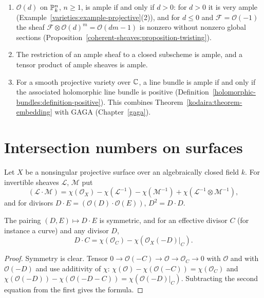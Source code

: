 \begin{example}\label{divisors:example-ample}
\begin{enumerate}
\item $\mathcal{O}(d)$ on $\mathbb{P}^n_k$, $n \geq 1$, is ample if and only if $d > 0$: for $d > 0$ it is very ample (Example~\ref{varieties:example-projective}(2)), and for
$d \leq 0$ and $\mathcal{F} = \mathcal{O}(-1)$ the sheaf $\mathcal{F} \otimes \mathcal{O}(d)^m = \mathcal{O}(dm - 1)$ is nonzero without nonzero global sections
(Proposition~\ref{coherent-sheaves:proposition-twisting}).
\item The restriction of an ample sheaf to a closed subscheme is ample, and a tensor product of ample sheaves is ample.
\item For a smooth projective variety over $\mathbb{C}$, a line bundle is ample if and only if the associated holomorphic line bundle is positive
(Definition~\ref{holomorphic-bundles:definition-positive}). This combines Theorem~\ref{kodaira:theorem-embedding} with GAGA (Chapter~\ref{gaga}).
\end{enumerate}
\end{example}

\section{Intersection numbers on surfaces}\label{divisors:section-intersection-surfaces}

\begin{definition}\label{divisors:definition-intersection-number}
Let $X$ be a nonsingular projective surface over an algebraically closed field $k$. For invertible sheaves $\mathcal{L}$, $\mathcal{M}$ put
\[
(\mathcal{L} \cdot \mathcal{M}) = \chi(\mathcal{O}_X) - \chi(\mathcal{L}^{-1}) - \chi(\mathcal{M}^{-1}) + \chi(\mathcal{L}^{-1} \otimes \mathcal{M}^{-1}),
\]
and for divisors $D \cdot E = (\mathcal{O}(D) \cdot \mathcal{O}(E))$, $D^2 = D \cdot D$.
\end{definition}

\begin{proposition}\label{divisors:proposition-intersection-curve}
The pairing $(D, E) \mapsto D \cdot E$ is symmetric, and for an effective divisor $C$ (for instance a curve) and any divisor $D$,
\[
D \cdot C = \chi(\mathcal{O}_C) - \chi(\mathcal{O}_X(-D)|_C) .
\]
\end{proposition}

\begin{proof}
Symmetry is clear. Tensor $0 \to \mathcal{O}(-C) \to \mathcal{O} \to \mathcal{O}_C \to 0$ with $\mathcal{O}$ and with $\mathcal{O}(-D)$ and use additivity of $\chi$:
$\chi(\mathcal{O}) - \chi(\mathcal{O}(-C)) = \chi(\mathcal{O}_C)$ and $\chi(\mathcal{O}(-D)) - \chi(\mathcal{O}(-D-C)) = \chi(\mathcal{O}(-D)|_C)$. Subtracting the second equation from the first
gives the formula.
\end{proof}

